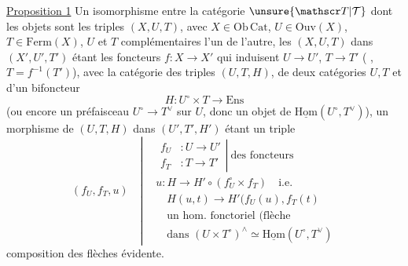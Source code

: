 \uline{Proposition 1} Un isomorphisme entre la catégorie $\unsure{\mathscr T|\mathcal T}$ dont les objets sont les triples $(X,U,T)$, avec $X\in\mathrm{Ob}\,\mathrm{Cat}$, $U\in\mathrm{Ouv}(X)$, $T\in\mathrm{Ferm}(X)$, $U$ et $T$ complémentaires l'un de l'autre, les  
$(X,U,T)$ dans $(X',U',T')$ étant les foncteurs $f:X\longrightarrow X'$ qui induisent $U\longrightarrow U'$, $T\longrightarrow T'$ ( , $T=f^{-1}(T')$), avec la catégorie  des triples $(U,T,H)$, de deux catégories $U,T$ et d'un bifoncteur
\[
H:U^\circ\times T\longrightarrow\mathrm{Ens}
\]
(ou encore un préfaisceau $U^\circ\longrightarrow T^\vee$ sur $U$, donc un objet de $\underline{\mathrm{Hom}}(U^\circ,T^\vee)$), un morphisme de $(U,T,H)$ dans $(U',T',H')$ étant un triple
\[
(f_U,f_T,u)\quad\left|\begin{aligned}&\left.\begin{aligned}f_U &: U\longrightarrow U'\\ f_T &: T\longrightarrow T'\end{aligned}\right|\ \text{des foncteurs}\\ &u:H\longrightarrow H'\circ(f_U^\circ\times f_T)\quad\text{i.e.}\\ &\quad H(u,t)\longrightarrow H'(f_U(u),f_T(t)\\ &\quad\text{un hom. fonctoriel (flèche}\\ &\quad\text{dans }(U\times T^\circ)^\wedge\simeq\underline{\mathrm{Hom}}(U^\circ,T^\vee)\end{aligned}\right.
\]
composition des flèches évidente.

